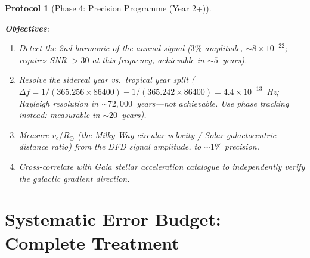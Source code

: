 \documentclass[11pt]{article}
\newtheorem{protocol}{Protocol}
\newcommand{\ee}[1]{\times 10^{#1}}
\begin{document}
\begin{protocol}[Phase 4: Precision Programme (Year 2+)]
\label{prot:phase4}
\mbox{}

\textbf{Objectives}:
\begin{enumerate}[nosep]
\item Detect the 2nd harmonic of the annual signal ($3\%$ amplitude,
  $\sim 8\ee{-22}$; requires SNR $> 30$ at this frequency, achievable
  in $\sim 5$~years).
\item Resolve the sidereal year vs.\ tropical year split ($\Delta f
  = 1/(365.256\times 86400) - 1/(365.242\times 86400) = 4.4\ee{-13}$~Hz;
  Rayleigh resolution in $\sim 72,000$~years---not achievable.
  Use phase tracking instead: measurable in $\sim 20$~years).
\item Measure $v_c/R_\odot$ (the Milky Way circular velocity / Solar
  galactocentric distance ratio) from the DFD signal amplitude, to
  $\sim 1\%$ precision.
\item Cross-correlate with Gaia stellar acceleration catalogue to
  independently verify the galactic gradient direction.
\end{enumerate}
\end{protocol}

\section{Systematic Error Budget: Complete Treatment}
\label{sec:systematics-complete}
\end{document}
